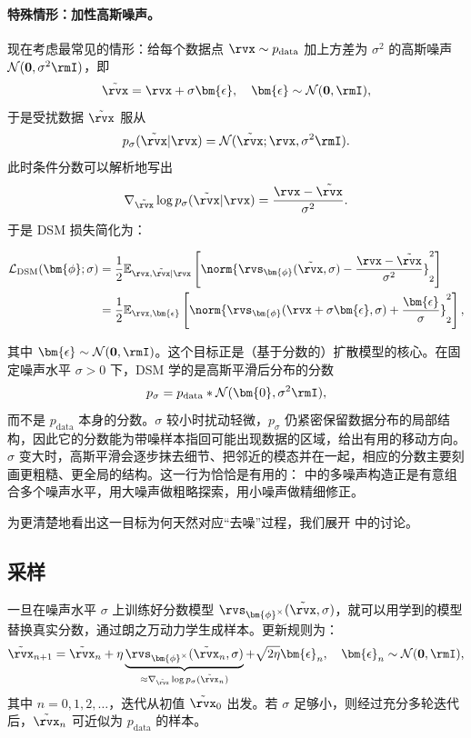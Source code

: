 \paragraph{特殊情形：加性高斯噪声。} 现在考虑最常见的情形：给每个数据点 $\rvx \sim p_{\text{data}}$ 加上方差为 $\sigma^2$ 的高斯噪声 $\mathcal{N}(\mathbf{0}, \sigma^2 \rmI)$，即
\[
\tilde{\rvx} = \rvx + \sigma \bm{\epsilon}, \quad \bm{\epsilon} \sim \mathcal{N}(\mathbf{0}, \rmI),
\]
于是受扰数据 $\tilde{\rvx}$ 服从
\[
p_{\sigma}(\tilde{\rvx}|\rvx) = \mathcal{N}(\tilde{\rvx}; \rvx, \sigma^2 \rmI).
\]
此时条件分数可以解析地写出
\[
\nabla_{\tilde{\rvx}} \log p_{\sigma}(\tilde{\rvx}|\rvx) = \frac{\rvx - \tilde{\rvx}}{\sigma^2}.
\]
于是 DSM 损失简化为：
\begin{mdframed}
\begin{align}\label{eq:gaussian-dsm}
\begin{aligned}
    \mathcal{L}_{\text{DSM}}(\bm{\phi}; \sigma) &= \frac{1}{2} \mathbb{E}_{\rvx, \tilde{\rvx}|\rvx} \left[ \norm{\rvs_{\bm{\phi}}(\tilde{\rvx}, \sigma) - \frac{\rvx - \tilde{\rvx}}{\sigma^2}}_2^2 \right] \\
    &= \frac{1}{2} \mathbb{E}_{\rvx, \bm{\epsilon}} \left[ \norm{\rvs_{\bm{\phi}}(\rvx + \sigma \bm{\epsilon}, \sigma) + \frac{\bm{\epsilon}}{\sigma}}_2^2 \right],
\end{aligned}
\end{align}
\end{mdframed}
其中 $\bm{\epsilon} \sim \mathcal{N}(\mathbf{0}, \rmI)$。这个目标正是（基于分数的）扩散模型的核心。在固定噪声水平 $\sigma>0$ 下，DSM 学的是高斯平滑后分布的分数
\[
p_\sigma
=
p_{\mathrm{data}} * \mathcal{N}(\bm{0},\sigma^2\rmI),
\]
而不是 $p_{\mathrm{data}}$ 本身的分数。$\sigma$ 较小时扰动轻微，$p_\sigma$ 仍紧密保留数据分布的局部结构，因此它的分数能为带噪样本指回可能出现数据的区域，给出有用的移动方向。$\sigma$ 变大时，高斯平滑会逐步抹去细节、把邻近的模态并在一起，相应的分数主要刻画更粗糙、更全局的结构。这一行为恰恰是有用的： 中的多噪声构造正是有意组合多个噪声水平，用大噪声做粗略探索，用小噪声做精细修正。


为更清楚地看出这一目标为何天然对应“去噪”过程，我们展开  中的讨论。


\subsection{采样}
一旦在噪声水平 $\sigma$ 上训练好分数模型 $\rvs_{\bm{\phi}^\times}(\tilde{\rvx}, \sigma)$，就可以用学到的模型替换真实分数，通过朗之万动力学生成样本。更新规则为：
\begin{align}\label{eq:score-langevin-emp-dsm}
   \tilde{\rvx}_{n+1} = \tilde{\rvx}_n + \eta \underbrace{\rvs_{\bm{\phi}^\times}(\tilde{\rvx}_n, \sigma)}_{\approx \nabla_{\tilde{\rvx}} \log p_\sigma(\tilde{\rvx}_n)} + \sqrt{2\eta}    \bm{\epsilon}_n, \quad \bm{\epsilon}_n \sim \mathcal{N}(\mathbf{0}, \rmI),
\end{align}
其中 $n = 0, 1, 2, \dots$，迭代从初值 $\tilde{\rvx}_0$ 出发。若 $\sigma$ 足够小，则经过充分多轮迭代后，$\tilde{\rvx}_n$ 可近似为 $p_{\text{data}}$ 的样本。


